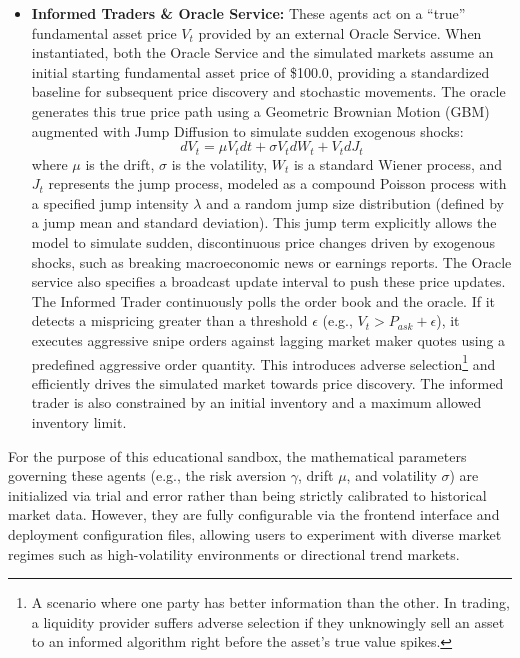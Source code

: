 \documentclass[12pt,a4paper]{article}
\begin{document}
\begin{itemize}
    \item \textbf{Informed Traders \& Oracle Service:} These agents act on a ``true'' fundamental asset price $V_t$ provided by an external Oracle Service. When instantiated, both the Oracle Service and the simulated markets assume an initial starting fundamental asset price of \$100.0, providing a standardized baseline for subsequent price discovery and stochastic movements. The oracle generates this true price path using a Geometric Brownian Motion (GBM) augmented with Jump Diffusion to simulate sudden exogenous shocks:
    \begin{equation}
        dV_t = \mu V_t dt + \sigma V_t dW_t + V_t dJ_t
    \end{equation}
    where $\mu$ is the drift, $\sigma$ is the volatility, $W_t$ is a standard Wiener process, and $J_t$ represents the jump process, modeled as a compound Poisson process with a specified jump intensity $\lambda$ and a random jump size distribution (defined by a jump mean and standard deviation). This jump term explicitly allows the model to simulate sudden, discontinuous price changes driven by exogenous shocks, such as breaking macroeconomic news or earnings reports. The Oracle service also specifies a broadcast update interval to push these price updates. The Informed Trader continuously polls the order book and the oracle. If it detects a mispricing greater than a threshold $\epsilon$ (e.g., $V_t > P_{ask} + \epsilon$), it executes aggressive snipe orders against lagging market maker quotes using a predefined aggressive order quantity. This introduces adverse selection\footnote{A scenario where one party has better information than the other. In trading, a liquidity provider suffers adverse selection if they unknowingly sell an asset to an informed algorithm right before the asset's true value spikes.} and efficiently drives the simulated market towards price discovery. The informed trader is also constrained by an initial inventory and a maximum allowed inventory limit.
\end{itemize}

For the purpose of this educational sandbox, the mathematical parameters governing these agents (e.g., the risk aversion $\gamma$, drift $\mu$, and volatility $\sigma$) are initialized via trial and error rather than being strictly calibrated to historical market data. However, they are fully configurable via the frontend interface and deployment configuration files, allowing users to experiment with diverse market regimes such as high-volatility environments or directional trend markets.
\end{document}
